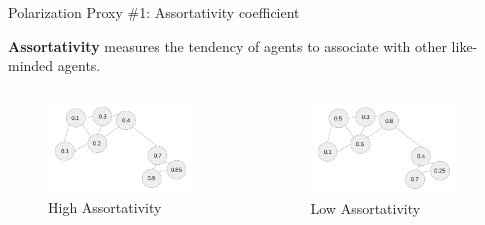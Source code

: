 \documentclass[12pt]{beamer}
\begin{document}
\begin{frame}[c]{Polarization Proxy \#1: Assortativity coefficient} %



\small 	\textbf{Assortativity} measures the tendency of agents to associate with other like-minded agents. 
	\vspace{0.2in}
\begin{columns}[onlytextwidth]
\begin{column}{.50\textwidth}
\begin{figure}
	\includegraphics[width=0.90\textwidth]{images/HighAssortDiagram.png}
	\small \caption{High Assortativity}
\end{figure}
\end{column}
\hfill
\begin{column}{.50\textwidth}
\begin{figure}
	\includegraphics[width=0.90\textwidth]{images/LowAssortDiagram.png}
	\small \caption{Low Assortativity}
\end{figure}
\end{column}
\end{columns}

\end{frame}
\end{document}
